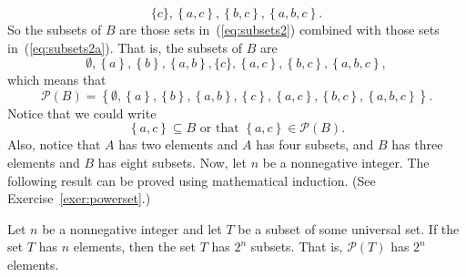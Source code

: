 \begin{equation} \label{eq:subsets2a}
\{ c \},\left\{ a, c \right\}\!,\left\{ b, c \right\}\!,\left\{ {a,b, c} \right\}\!.
\end{equation}
So the subsets of $B$ are those sets in~(\ref{eq:subsets2}) combined with those sets in~(\ref{eq:subsets2a}).  That is, the subsets of $B$ are
\begin{equation} \label{eq:subsets2b}
\emptyset,\left\{ a \right\}\!,\left\{ b \right\}\!,\left\{ {a,b} \right\}, \{ c \},\left\{ a, c \right\}\!,\left\{ b, c \right\}\!,\left\{ {a,b, c} \right\}\!,
\end{equation}
which means that
\[
\mathcal{P}( B ) = \left\{ {\emptyset,\left\{ a \right\}\!, \left\{ b \right\}\!, \left\{ {a, b} \right\}\!,\left\{ c \right\}\!,\left\{ {a,c} \right\}\!,\left\{ {b,c} \right\}\!,\left\{ {a,b,c} \right\}} \right\}\!.
\]
Notice that we could write
\[
\left\{ {a,c} \right\} \subseteq B \text{  or that  }\left\{ {a,c} \right\} \in \mathcal{P}( B ).
\]
Also, notice that $A$  has two  elements and $A$ has four subsets, and $B$  has  three  elements and $B$  has  eight  subsets.  Now, let  $n$  be a  nonnegative integer.  The following result can be proved using mathematical induction.  (See Exercise~\ref{exer:powerset}.)
\begin{theorem} \label{T:powerset}
Let $n$ be a nonnegative integer and let $T$ be a subset of some universal set.  If the set $T$ has $n$ elements, then the set $T$ has $2^n$ subsets.  That is, $\mathcal{P}(T)$ has $2^n$ elements.
\end{theorem}

\endinput
